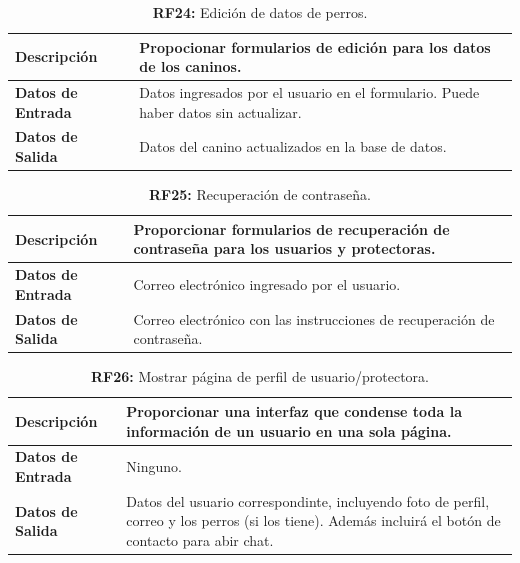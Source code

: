 \documentclass[a4paper, 12pt]{article}
\begin{document}
\begin{table}[H]
\captionsetup{justification=raggedright,singlelinecheck=false}
\caption{\textbf{RF24:} Edición de datos de perros.}
\label{tab:RF24}
	\begin{tabular}{|m{5cm}|m{10cm}|}
	\hline
	\textbf{Descripción} & Propocionar formularios de edición para los datos de los caninos. \\ 
	\hline
	\textbf{Datos de Entrada} &  Datos ingresados por el usuario en el formulario. Puede haber datos sin actualizar.  \\ 
	\hline
	\textbf{Datos de Salida} &   Datos del canino actualizados en la base de datos. \\ 
	\hline
\end{tabular}
\end{table}

\begin{table}[H]
\captionsetup{justification=raggedright,singlelinecheck=false}
\caption{\textbf{RF25:} Recuperación de contraseña.}
\label{tab:RF25}
	\begin{tabular}{|m{5cm}|m{10cm}|}
	\hline
	\textbf{Descripción} & Proporcionar formularios de recuperación de contraseña para los usuarios y protectoras. \\ 
	\hline
	\textbf{Datos de Entrada} & Correo electrónico ingresado por el usuario. \\ 
	\hline
	\textbf{Datos de Salida} & Correo electrónico con las instrucciones de recuperación de contraseña. \\ 
	\hline
\end{tabular}
\end{table}

\begin{table}[H]
\captionsetup{justification=raggedright,singlelinecheck=false}
\caption{\textbf{RF26:} Mostrar página de perfil de usuario/protectora.}
\label{tab:RF26}
	\begin{tabular}{|m{5cm}|m{10cm}|}
	\hline
	\textbf{Descripción} & Proporcionar una interfaz que condense toda la información de un usuario en una sola página. \\ 
	\hline
	\textbf{Datos de Entrada} & Ninguno. \\ 
	\hline
	\textbf{Datos de Salida} & Datos del usuario correspondinte, incluyendo foto de perfil, correo y los perros (si los tiene). Además incluirá el botón de contacto para abir chat. \\ 
	\hline
\end{tabular}
\end{table}
\end{document}
